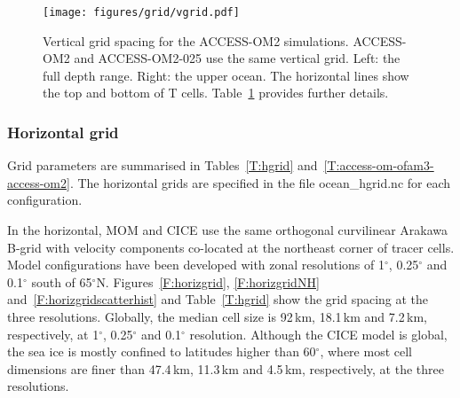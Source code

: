 \documentclass[11pt]{article}
\newcommand{\paramsty}[1]{\textsf{#1}}
\newcommand{\param}[1]{\paramsty{#1}\index{\paramsty{#1}}}
\begin{document}
\begin{figure}[htp]
\texttt{[image: figures/grid/vgrid.pdf]}
\caption[Vertical grid spacing for the ACCESS-OM2 simulations.]{Vertical grid spacing for the ACCESS-OM2 simulations. 
ACCESS-OM2 and ACCESS-OM2-025 use the same vertical grid.
Left: the full depth range. 
Right: the upper ocean. 
The horizontal lines show the top and bottom of T cells.
Table~\ref{F:vgrid} provides further details.}
\label{F:vgrid}
\end{figure}

\pagebreak %
\subsubsection{Horizontal grid}\label{S:horizgrid}

Grid parameters are summarised in Tables~\ref{T:hgrid} and~\ref{T:access-om-ofam3-access-om2}.
The horizontal grids are specified in the file \param{ocean_hgrid.nc} for each configuration.

In the horizontal, MOM and CICE use the same orthogonal curvilinear Arakawa B-grid with velocity components co-located at the northeast corner of tracer cells. 
Model configurations have been developed with zonal resolutions of 1$^\circ$, 0.25$^\circ$ and 0.1$^\circ$ south of 65$^\circ$N.
Figures~\ref{F:horizgrid}, \ref{F:horizgridNH} and~\ref{F:horizgridscatterhist} and Table~\ref{T:hgrid} show the grid spacing at the three resolutions.
Globally, the median cell size is 92\,km, 18.1\,km and 7.2\,km, respectively, at 1$^\circ$, 0.25$^\circ$ and 0.1$^\circ$ resolution.
Although the CICE model is global, the sea ice is mostly confined to latitudes higher than 60$^\circ$, where most cell dimensions are finer than 47.4\,km, 11.3\,km and 4.5\,km, respectively, at the three resolutions.
\end{document}
